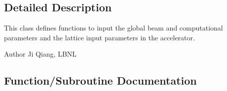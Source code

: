 \subsection{Detailed Description}
This class defines functions to input the global beam and computational parameters and the lattice input parameters in the accelerator. 

\begin{DoxyAuthor}{Author}
Ji Qiang, L\+B\+NL 
\end{DoxyAuthor}


\subsection{Function/\+Subroutine Documentation}
\mbox{\label{namespaceinputclass_a907319f6e5d34930fbc63f5af426e9bd}} 
